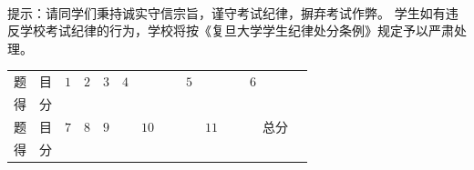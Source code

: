 ~\\


\begin{center}

\end{center}

\qquad 提示：请同学们秉持诚实守信宗旨，谨守考试纪律，摒弃考试作弊。
学生如有违反学校考试纪律的行为，学校将按《复旦大学学生纪律处分条例》规定予以严肃处理。

\begin{table}
\begin{tabular}{|c|c|c|c|}
题\ \ 目 &\quad$1$\quad&\quad$2$\quad&\quad$3$\quad&\quad$4$\quad&\quad$5$\quad&\quad$6$\quad\\
得\ \ 分 & & & & & & \\
题\ \ 目 &\quad$7$\quad&\quad$8$\quad&\quad$9$\quad&\ \ \ $10$\ \ \ &\ \ \ $11$\ \ \ &\ \ 总分\ \ \\
得\ \ 分 & & & & & & 
\end{tabular}
\end{table}

